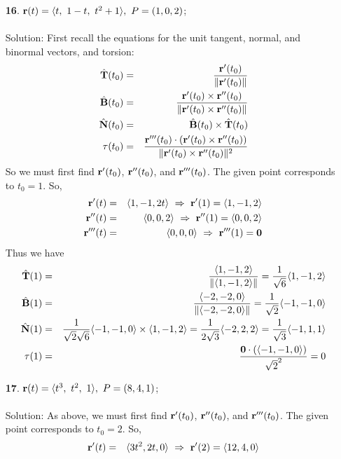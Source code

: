\documentclass[12pt]{amsbook}
\newcommand{\la}{\langle}
\newcommand{\ra}{\rangle}
\begin{document}
\begin{enumerate}
  \item[{\small\bf 16}.] ${\bf r}(t)=\la t,\ 1-t,\ t^2+1\ra, \ P=(1,0,2)$;
  \\
  \\
  {\sc Solution}: First recall the equations for the unit tangent, normal, and binormal vectors, and  torsion:
  \begin{eqnarray*}
  \hat{\bf T}(t_0)&=&\frac{{\bf r}'(t_0)}{\|{\bf r}'(t_0)\|} \\
  \hat{\bf B}(t_0)&=&\frac{{\bf r}'(t_0)\times{\bf r}''(t_0)}{\|{\bf r}'(t_0)\times{\bf r}''(t_0)\|} \\
  \hat{\bf N}(t_0)&=&\hat{\bf B}(t_0)\times\hat{\bf T}(t_0) \\
  \tau(t_0)&=&\frac{{\bf r}'''(t_0)\cdot({\bf r}'(t_0)\times{\bf r}''(t_0))}{\|{\bf r}'(t_0)\times{\bf r}''(t_0)\|^2}
  \end{eqnarray*}
  So we must first find ${\bf r}'(t_0)$, ${\bf r}''(t_0)$, and ${\bf r}'''(t_0)$. The given point corresponds to $t_0=1$. So,
  \begin{eqnarray*}
  {\bf r}'(t)&=&\la 1,-1, 2t \ra \ \Rightarrow \ {\bf r}'(1)=\la 1,-1, 2 \ra \\
  {\bf r}''(t)&=&\la 0,0,2 \ra \ \Rightarrow \ {\bf r}''(1)=\la 0,0,2 \ra \\
  {\bf r}'''(t)&=&\la 0,0,0 \ra  \ \Rightarrow \ {\bf r}'''(1)={\bf 0}
  \end{eqnarray*}
  Thus we have
  \begin{eqnarray*}
  \hat{\bf T}(1)&=&\frac{\la 1,-1, 2 \ra}{\|\la 1,-1, 2 \ra\|}=\frac{1}{\sqrt{6}}\la 1,-1,2 \ra \\
  \hat{\bf B}(1)&=&\frac{\la -2,-2,0 \ra}{\|\la -2,-2,0 \ra\|}=\frac{1}{\sqrt{2}}\la -1,-1,0 \ra \\
  \hat{\bf N}(1)&=&\frac{1}{\sqrt{2}\sqrt{6}} \la -1,-1,0 \ra\times\la 1,-1,2 \ra=\frac{1}{2\sqrt{3}}\la -2,2,2 \ra= \frac{1}{\sqrt{3}}\la -1,1,1 \ra\\
  \tau(1)&=&\frac{{\bf 0}\cdot(\la -1,-1,0 \ra)}{\sqrt{2}^2}=0
  \end{eqnarray*}  
  \item[{\small\bf 17}.] ${\bf r}(t)=\la t^3,\ t^2,\ 1\ra, \ P=(8,4,1)$;
  \\
  \\
  {\sc Solution}: As above, we must first find ${\bf r}'(t_0)$, ${\bf r}''(t_0)$, and ${\bf r}'''(t_0)$. The given point corresponds to $t_0=2$. So,
  \begin{eqnarray*}
  {\bf r}'(t)&=&\la 3t^2,2t,0 \ra \ \Rightarrow \ {\bf r}'(2)=\la 12,4,0 \ra \\

\end{eqnarray*}
\end{enumerate}
\end{document}
